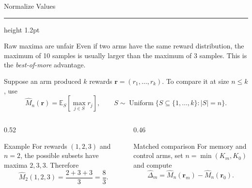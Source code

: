 \documentclass[aspectratio=169]{beamer}
\newcommand{\titlerule}{{\color{titledred}\hrule height 1.2pt}}
\begin{document}
\begin{frame}{Normalize Values}
\vspace{-0.05em}
\titlerule
\vspace{0.35em}

\small

\begin{block}{Raw maxima are unfair}
Even if two arms have the same reward distribution, the maximum of 10 samples
is usually larger than the maximum of 3 samples. This is the
\emph{best-of-more} advantage.
\end{block}

{\small Suppose an arm produced $k$ rewards $\mathbf r=(r_1,\ldots,r_k)$.
To compare it at size $n\le k$, use}
\[
\widehat M_n(\mathbf r)
=
\mathbb{E}_{S}\!\left[
\max_{j\in S}r_j
\right],
\qquad
S\sim\operatorname{Uniform}\{S\subseteq\{1,\ldots,k\}:|S|=n\}.
\]

\begin{columns}[T,onlytextwidth]
\begin{column}{0.52\textwidth}
\begin{block}{Example}
For rewards $(1,2,3)$ and $n=2$, the possible subsets have maxima
$2,3,3$. Therefore
\[
\widehat M_2(1,2,3)=\frac{2+3+3}{3}=\frac{8}{3}.
\]
\end{block}
\end{column}
\begin{column}{0.46\textwidth}
\begin{block}{Matched comparison}
For memory and control arms, set $n=\min(K_m,K_0)$ and compute
\[
\widehat\Delta_m
=\widehat M_n(\mathbf r_m)
-\widehat M_n(\mathbf r_0).
\]
\end{block}
\end{column}
\end{columns}
\end{frame}


\end{document}
